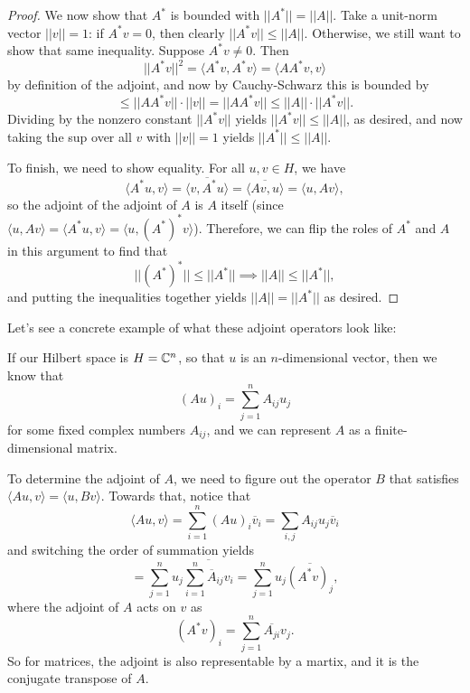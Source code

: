 \begin{proof}
We now show that $A^\ast$ is bounded with $||A^\ast|| = ||A||$. Take a unit-norm vector $||v|| = 1$: if $A^\ast v = 0$, then clearly $||A^\ast v || \le ||A||$. Otherwise, we still want to show that same inequality. Suppose $A^\ast v \ne 0$. Then 
\[
    \boxed{||A^\ast v ||^2} = \langle A^\ast v, A^\ast v \rangle = \langle A A^\ast v, v \rangle
\]
by definition of the adjoint, and now by Cauchy-Schwarz this is bounded by 
\[
    \le ||AA^\ast v || \cdot ||v|| = ||A A^\ast v || \le \boxed{||A|| \cdot ||A^\ast v||}.
\]
Dividing by the nonzero constant $||A^\ast v||$ yields $||A^\ast v|| \le ||A||$, as desired, and now taking the sup over all $v$ with $||v|| = 1$ yields $||A^\ast|| \le ||A||$.

To finish, we need to show equality. For all $u, v \in H$, we have
\[
    \langle A^\ast u, v \rangle = \overline{\langle v, A^\ast u \rangle} = \overline{\langle Av, u \rangle} = \langle u, Av \rangle,
\]
so the adjoint of the adjoint of $A$ is $A$ itself (since $\langle u, Av \rangle = \langle A^\ast u, v \rangle = \langle u, (A^\ast)^\ast v \rangle$). Therefore, we can flip the roles of $A^\ast$ and $A$ in this argument to find that
\[
    ||(A^\ast)^\ast|| \le ||A^\ast|| \implies ||A|| \le ||A^\ast||,
\]
and putting the inequalities together yields $||A|| = ||A^\ast||$ as desired. 
\end{proof}

Let's see a concrete example of what these adjoint operators look like:

\begin{example}
If our Hilbert space is $H = \mathbb C^n$, so that $u$ is an $n$-dimensional vector, then we know that 
\[
    (Au)_i = \sum_{j=1}^n A_{ij} u_j
\]
for some fixed complex numbers $A_{ij}$, and we can represent $A$ as a finite-dimensional matrix.
\end{example}

To determine the adjoint of $A$, we need to figure out the operator $B$ that satisfies $\langle Au, v \rangle = \langle u, Bv \rangle$. Towards that, notice that
\[
    \langle Au, v \rangle  = \sum_{i=1}^n (Au)_i \overline{v}_i = \sum_{i,j} A_{ij} u_j \overline{v}_i 
\]
and switching the order of summation yields 
\[
    = \sum_{j=1}^n u_j \overline{\sum_{i=1}^n \overline{A}_{ij} v_i} = \sum_{j=1}^n u_j \overline{(A^\ast v)_j},
\]
where the adjoint of $A$ acts on $v$ as 
\[
    (A^\ast v)_i = \sum_{j=1}^n \overline{A_{ji}} v_j.
\]
So for matrices, the adjoint is also representable by a martix, and it is the conjugate transpose of $A$.

